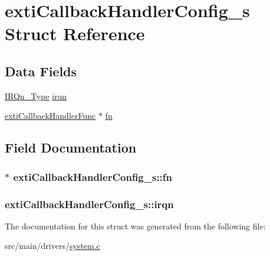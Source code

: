 \hypertarget{structextiCallbackHandlerConfig__s}{\section{exti\+Callback\+Handler\+Config\+\_\+s Struct Reference}
\label{structextiCallbackHandlerConfig__s}
}
\subsection*{Data Fields}
\begin{DoxyCompactItemize}
\item 
\hyperlink{test_2unit_2platform_8h_a7e1129cd8a196f4284d41db3e82ad5c8}{I\+R\+Qn\+\_\+\+Type} \hyperlink{structextiCallbackHandlerConfig__s_a30c1238aa22ecea1e2cdea55a7da9ade}{irqn}
\item 
\hyperlink{drivers_2system_8h_a605c56adbc9c1679eb70dbf353757953}{exti\+Callback\+Handler\+Func} $\ast$ \hyperlink{structextiCallbackHandlerConfig__s_ad80416c4c822a5465efbc158bf6bcc70}{fn}
\end{DoxyCompactItemize}


\subsection{Field Documentation}
\hypertarget{structextiCallbackHandlerConfig__s_ad80416c4c822a5465efbc158bf6bcc70}{
\subsubsection[{fn}]{$\ast$ exti\+Callback\+Handler\+Config\+\_\+s\+::fn}}\label{structextiCallbackHandlerConfig__s_ad80416c4c822a5465efbc158bf6bcc70}
\hypertarget{structextiCallbackHandlerConfig__s_a30c1238aa22ecea1e2cdea55a7da9ade}{
\subsubsection[{irqn}]{ exti\+Callback\+Handler\+Config\+\_\+s\+::irqn}}\label{structextiCallbackHandlerConfig__s_a30c1238aa22ecea1e2cdea55a7da9ade}


The documentation for this struct was generated from the following file\+:\begin{DoxyCompactItemize}
\item 
src/main/drivers/\hyperlink{system_8c}{system.\+c}\end{DoxyCompactItemize}
